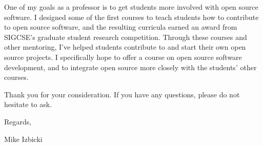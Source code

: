 \documentclass[12pt]{article}
\newcommand{\school}[2]{\textcolor{red}{\textbf{{#1}:} {#2}}}
\begin{document}
\noindent
One of my goals as a professor is to get students more involved with open source software.
I designed some of the first courses to teach students how to contribute to open source software,
and the resulting curricula earned an award from SIGCSE's graduate student research competition.
Through these courses and other mentoring, 
I've helped students contribute to and start their own open source projects.
I specifically hope to offer a course on open source software development,
and to integrate open source more closely with the students' other courses.

\noindent
Thank you for your consideration.
If you have any questions,
please do not hesitate to ask.

\noindent
Regards,

\vspace{-0.15in}
\noindent
Mike Izbicki

%
%
%
%
%
\end{document}
